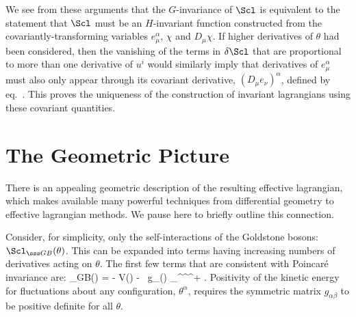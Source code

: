 \documentclass[12pt,epsf]{report}
\begin{document}
We see from these arguments that the $G$-invariance of
$\Scl$ is equivalent to the statement that $\Scl$ must be
an $H$-invariant function constructed from the
covariantly-transforming variables $e^\alpha_\mu$, $\chi$
and $D_\mu \chi$. If higher derivatives of $\theta$ had
been considered, then the vanishing of the terms in 
$\delta \Scl$ that are proportional to more than one
derivative of $u^i$ would similarly imply that derivatives
of $e^\alpha_\mu$ must also only appear through its
covariant derivative, $(D_\mu e_\nu)^\alpha$, defined by
eq.~. This proves the uniqueness of the
construction of invariant lagrangians using these covariant
quantities.

\section{The Geometric Picture}

There is an appealing geometric description of the
resulting effective lagrangian, which makes available many
powerful techniques from differential geometry to effective
lagrangian methods. We pause here to briefly outline this
connection.

Consider, for simplicity, only the self-interactions of the
Goldstone bosons: $\Scl_{\sss GB}(\theta)$. This can be
expanded into terms having increasing numbers of
derivatives acting on $\theta$. The first few terms that
are consistent with Poincar\'e invariance are:  
%
\eq
\label{gblagronly}
\Scl_{\sss GB}(\theta) = - V(\theta) - \hf \, 
g_{\alpha\beta}(\theta) \;
\partial_\mu \theta^\alpha \partial^\mu \theta^\beta +
\cdots .
\eeq
%
Positivity of the kinetic energy for fluctuations about any
configuration, $\theta^\alpha$, requires the symmetric
matrix $g_{\alpha\beta}$ to be positive definite for all
$\theta$.
\end{document}
